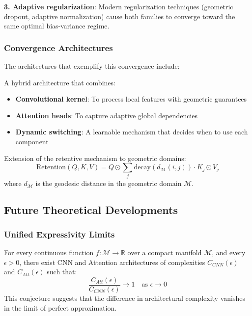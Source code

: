 \textbf{3. Adaptive regularization}: Modern regularization techniques (geometric dropout, adaptive normalization) cause both families to converge toward the same optimal bias-variance regime.

\subsubsection{Convergence Architectures}

The architectures that exemplify this convergence include:

\begin{definition}\label{def:convnext_attention}
A hybrid architecture that combines:
\begin{itemize}
    \item \textbf{Convolutional kernel}: To process local features with geometric guarantees
    \item \textbf{Attention heads}: To capture adaptive global dependencies
    \item \textbf{Dynamic switching}: A learnable mechanism that decides when to use each component
\end{itemize}
\end{definition}

\begin{definition}\label{def:retentive_networks_geometricas}
Extension of the retentive mechanism to geometric domains:
\begin{equation}
    \text{Retention}(Q, K, V) = Q \odot \sum_{j} \text{decay}(d_\mathcal{M}(i,j)) \cdot K_j \odot V_j
\end{equation}
where $d_\mathcal{M}$ is the geodesic distance in the geometric domain $\mathcal{M}$.
\end{definition}

\subsection{Future Theoretical Developments}\label{subsec:desarrollos_teoricos_futuros}

\subsubsection{Unified Expressivity Limits}

\begin{conjecture}\label{conj:limites_universales}
For every continuous function $f: \mathcal{M} \to \mathbb{R}$ over a compact manifold $\mathcal{M}$, and every $\epsilon > 0$, there exist CNN and Attention architectures of complexities $C_{CNN}(\epsilon)$ and $C_{Att}(\epsilon)$ such that:
\begin{equation}
    \frac{C_{Att}(\epsilon)}{C_{CNN}(\epsilon)} \to 1 \quad \text{as } \epsilon \to 0
\end{equation}
This conjecture suggests that the difference in architectural complexity vanishes in the limit of perfect approximation.
\end{conjecture}

